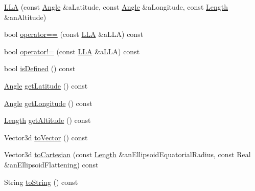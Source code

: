\begin{DoxyCompactItemize}
\item 
\hyperlink{classlibrary_1_1physics_1_1coord_1_1spherical_1_1_l_l_a_af18b9011d2df6c1120e0f770ab1eb909}{L\+LA} (const \hyperlink{classlibrary_1_1physics_1_1units_1_1_angle}{Angle} \&a\+Latitude, const \hyperlink{classlibrary_1_1physics_1_1units_1_1_angle}{Angle} \&a\+Longitude, const \hyperlink{classlibrary_1_1physics_1_1units_1_1_length}{Length} \&an\+Altitude)
\item 
bool \hyperlink{classlibrary_1_1physics_1_1coord_1_1spherical_1_1_l_l_a_a104c505db9941b6d21c10e0478cdc1f2}{operator==} (const \hyperlink{classlibrary_1_1physics_1_1coord_1_1spherical_1_1_l_l_a}{L\+LA} \&a\+L\+LA) const
\item 
bool \hyperlink{classlibrary_1_1physics_1_1coord_1_1spherical_1_1_l_l_a_a150b8dd334c6874643a4675f9f67538b}{operator!=} (const \hyperlink{classlibrary_1_1physics_1_1coord_1_1spherical_1_1_l_l_a}{L\+LA} \&a\+L\+LA) const
\item 
bool \hyperlink{classlibrary_1_1physics_1_1coord_1_1spherical_1_1_l_l_a_a9784847b6e35cf506896e6810ec73f23}{is\+Defined} () const
\item 
\hyperlink{classlibrary_1_1physics_1_1units_1_1_angle}{Angle} \hyperlink{classlibrary_1_1physics_1_1coord_1_1spherical_1_1_l_l_a_a4cae48d00f1f5319c1560f1bfe1b2cb5}{get\+Latitude} () const
\item 
\hyperlink{classlibrary_1_1physics_1_1units_1_1_angle}{Angle} \hyperlink{classlibrary_1_1physics_1_1coord_1_1spherical_1_1_l_l_a_a55ca45ade10658e903628afb5e35fc56}{get\+Longitude} () const
\item 
\hyperlink{classlibrary_1_1physics_1_1units_1_1_length}{Length} \hyperlink{classlibrary_1_1physics_1_1coord_1_1spherical_1_1_l_l_a_a2f35237c136581669e9a49e310633b58}{get\+Altitude} () const
\item 
Vector3d \hyperlink{classlibrary_1_1physics_1_1coord_1_1spherical_1_1_l_l_a_aed6303008da6b6c85c3abdda2bd63c24}{to\+Vector} () const
\item 
Vector3d \hyperlink{classlibrary_1_1physics_1_1coord_1_1spherical_1_1_l_l_a_a345c00ef99eeb403a79453c7829b413c}{to\+Cartesian} (const \hyperlink{classlibrary_1_1physics_1_1units_1_1_length}{Length} \&an\+Ellipsoid\+Equatorial\+Radius, const Real \&an\+Ellipsoid\+Flattening) const
\item 
String \hyperlink{classlibrary_1_1physics_1_1coord_1_1spherical_1_1_l_l_a_a082872655279f13c9b524467064cb4bb}{to\+String} () const
\end{DoxyCompactItemize}
